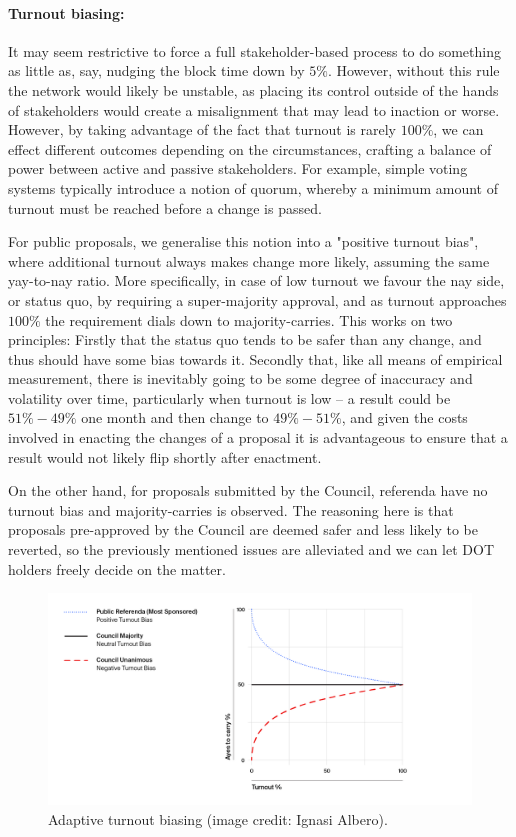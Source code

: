 \documentclass{article}
\begin{document}
\paragraph{Turnout biasing:} It may seem restrictive to force a full stakeholder-based process to do something as little as, say, nudging the block time down by $5\%$. However, without this rule the network would likely be unstable, as placing its control outside of the hands of stakeholders would create a misalignment that may lead to inaction or worse. However, by taking advantage of the fact that turnout is rarely $100\%$, we can effect different outcomes depending on the circumstances, crafting a balance of power between active and passive stakeholders. For example, simple voting systems typically introduce a notion of quorum, whereby a minimum amount of turnout must be reached before a change is passed. 

For public proposals, we generalise this notion into a "positive turnout bias", where additional turnout always makes change more likely, assuming the same yay-to-nay ratio. More specifically, in case of low turnout we favour the nay side, or status quo, by requiring a super-majority approval, and as turnout approaches $100\%$ the requirement dials down to majority-carries. This works on two principles: Firstly that the status quo tends to be safer than any change, and thus should have some bias towards it. Secondly that, like all means of empirical measurement, there is inevitably going to be some degree of inaccuracy and volatility over time, particularly when turnout is low -- a result could be $51\%-49\%$ one month and then change to $49\%-51\%$, and given the costs involved in enacting the changes of a proposal it is advantageous to ensure that a result would not likely flip shortly after enactment. 

On the other hand, for proposals submitted by the Council, referenda have no turnout bias and majority-carries is observed. The reasoning here is that proposals pre-approved by the Council are deemed safer and less likely to be reverted, so the previously mentioned issues are alleviated and we can let DOT holders freely decide on the matter. 

\begin{figure}[htb]
	\centering
	\includegraphics[width=1.1\textwidth]{Turnout-Bias.png}
	\caption{Adaptive turnout biasing (image credit: Ignasi Albero).}
	\label{fig:biasing}
\end{figure}
\end{document}

